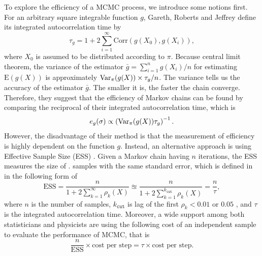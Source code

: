 To explore the efficiency of a MCMC process, we introduce some notions first. For an arbitrary square integrable function $g$, Gareth, Roberts and Jeffrey \cite{roberts2001optimal} define its integrated autocorrelation time by 
\begin{equation*}
\tau_g = 1+ 2\sum_{i=1}^{\infty} \mathrm{Corr}\left( g(X_0),g(X_i) \right),
\end{equation*}
where $X_0$ is assumed to be distributed according to $\pi$. Because central limit theorem, the variance of the estimator $\bar{g} = \sum_{i=1}^{n}g(X_i)/n$ for estimating $\mathrm{E}(g(X))$ is approximately $\mathrm{Var}_\pi(g(X))\times \tau_g/n$. The variance tells us the accuracy of the estimator $\bar{g}$. The smaller it is, the faster the chain converge. Therefore, they suggest that the efficiency of Markov chains can be found by comparing the reciprocal of their integrated autocorrelation time, which is 
\begin{equation*}
e_g(\sigma)\propto \left( \mathrm{Var}_\pi (g(X))\tau_g  \right)^{-1}. 
\end{equation*}
However, the disadvantage of their method is that the measurement of efficiency is highly dependent on the function $g$. Instead, an alternative approach is using Effective Sample Size (ESS) \cite{kass1998markov}\cite{robert2004monte}. Given a Markov chain having $n$ iterations, the ESS measures the size of \iid . samples with the same standard error, which is defined in \cite{gong2016practical} in the following form of  
\begin{equation*}
\mbox{ESS} =  \frac{n}{1+2\sum_{k=1}^{\infty}\rho_k(X)} \approxeq \frac{n}{1+2\sum_{k=1}^{k_\mathtt{cut}}\rho_k(X)}= \frac{n}{\tau}, 
\end{equation*}
where $n$ is the number of samples, $k_\mathtt{cut}$ is lag of the first $\rho_k<0.01 \mbox{ or } 0.05$ , and $\tau$ is the integrated autocorrelation time. Moreover, a wide support among both statisticians \cite{geyer1992practical} and physicists \cite{sokal1997monte} are using the following cost of an independent sample to evaluate the performance of MCMC, that is 
\begin{equation*}
\frac{n}{\mbox{ESS}}\times \mbox{cost per step} = \tau \times  \mbox{cost per step}.
\end{equation*} 


